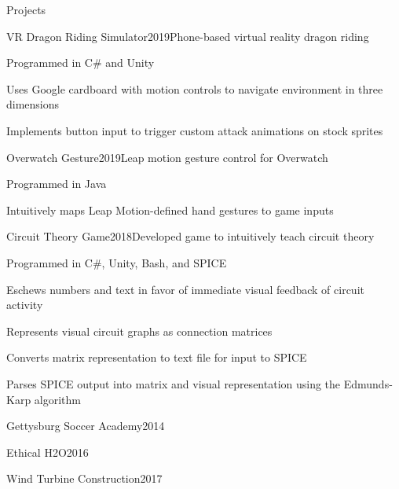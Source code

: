 \documentclass{resume} %
\begin{document}
\begin{rSection}{Projects}

\begin{rWorkSubsection}{VR Dragon Riding Simulator}{2019}{Phone-based virtual reality dragon riding}{}
\item Programmed in C\# and Unity
\item Uses Google cardboard with motion controls to navigate environment in three dimensions 
\item Implements button input to trigger custom attack animations on stock sprites
\end{rWorkSubsection}


\begin{rWorkSubsection}{Overwatch Gesture}{2019}{Leap motion gesture control for Overwatch}{}
\item Programmed in Java
\item Intuitively maps Leap Motion-defined hand gestures to game inputs
\end{rWorkSubsection}


\begin{rWorkSubsection}{Circuit Theory Game}{2018}{Developed game to intuitively teach circuit theory}{}
\item Programmed in C\#, Unity, Bash, and SPICE
\item Eschews numbers and text in favor of immediate visual feedback of circuit activity
\item Represents visual circuit graphs as connection matrices
\item Converts matrix representation to text file for input to SPICE
\item Parses SPICE output into matrix and visual representation using the Edmunds-Karp algorithm
\end{rWorkSubsection}


\begin{rWorkSubsection}{Gettysburg Soccer Academy}{2014}{}{}
\item 
\end{rWorkSubsection}


\begin{rWorkSubsection}{Ethical H2O}{2016}{}{}
\item 
\end{rWorkSubsection}


\begin{rWorkSubsection}{Wind Turbine Construction}{2017}{}{}
\item 
\end{rWorkSubsection}

\end{rSection}
\end{document}
